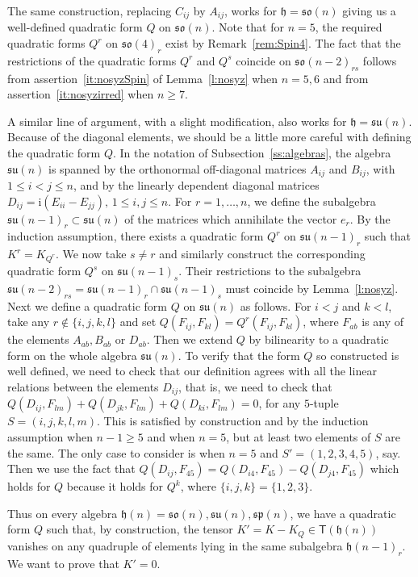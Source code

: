 \documentclass[10pt,a4paper]{amsart}
\newcommand \sT{\mathsf{T}}
\newcommand\h{\mathfrak h}
\newcommand \so{\mathfrak{so}}
\newcommand \spg{\mathfrak{sp}}
\newcommand \su{\mathfrak{su}}
\newcommand \ir{\mathrm{i}}
\newcommand \<{\langle}
\renewcommand \>{\rangle}
\begin{document}
	The same construction, replacing $C_{ij}$ by $A_{ij}$, works for $\h=\so(n)$ giving us a well-defined quadratic form $Q$ on $\so(n)$. Note that for $n=5$, the required quadratic forms $Q^r$ on $\so(4)_r$ exist by Remark~\ref{rem:Spin4}. The fact that the restrictions of the quadratic forms $Q^r$ and $Q^s$ coincide on $\so(n-2)_{rs}$ follows from assertion~\eqref{it:nosyzSpin} of Lemma~\ref{l:nosyz} when $n=5,6$ and from assertion~\eqref{it:nosyzirred} when $n \ge 7$.
	
	A similar line of argument, with a slight modification, also works for $\h = \su(n)$. Because of the diagonal elements, we should be a little more careful with defining the quadratic form $Q$. In the notation of Subsection~\ref{ss:algebras}, the algebra $\su(n)$ is spanned by the orthonormal off-diagonal matrices $A_{ij}$ and $B_{ij}$, with $1 \le i < j\le n$, and by the linearly dependent diagonal matrices $D_{ij} = \ir (E_{ii}- E_{jj}), \, 1 \le i, j\le n$. For $r=1, \dots, n$, we define the subalgebra $\su(n-1)_r \subset \su(n)$ of the matrices which annihilate the vector $e_r$. By the induction assumption, there exists a quadratic form $Q^r$ on $\su(n-1)_r$ such that $K^r = K_{Q^r}$. We now take $s \ne r$ and similarly construct the corresponding quadratic form $Q^s$ on $\su(n-1)_s$. Their restrictions to the subalgebra $\su(n-2)_{rs} = \su(n-1)_r \cap \su(n-1)_s$ must coincide by Lemma~\ref{l:nosyz}. Next we define a quadratic form $Q$ on $\su(n)$ as follows. For $i < j$ and $k < l$, take any $r \notin \{i,j,k,l\}$ and set $Q(F_{ij}, F_{kl}) = Q^r(F_{ij}, F_{kl})$, where $F_{ab}$ is any of the elements $A_{ab}, B_{ab}$ or $D_{ab}$. Then we extend $Q$ by bilinearity to a quadratic form on the whole algebra $\su(n)$. To verify that the form $Q$ so constructed is well defined, we need to check that our definition agrees with all the linear relations between the elements $D_{ij}$, that is, we need to check that $Q(D_{ij}, F_{lm}) + Q(D_{jk}, F_{lm}) + Q(D_{ki}, F_{lm}) = 0$, for any $5$-tuple $S=(i,j,k,l,m)$. This is satisfied by construction and by the induction assumption when $n-1 \ge 5$ and when $n = 5$, but at least two elements of $S$ are the same. The only case to consider is when $n=5$ and $S'=(1,2,3,4,5)$, say. Then we use the fact that $Q(D_{ij}, F_{45}) = Q(D_{i4}, F_{45}) - Q(D_{j4}, F_{45})$ which holds for $Q$ because it holds for $Q^k$, where $\{i,j,k\} = \{1,2,3\}$.
	
	Thus on every algebra $\h(n) = \so(n), \su(n), \spg(n)$, we have a quadratic form $Q$ such that, by construction, the tensor $K' = K - K_Q \in \sT(\h(n))$ vanishes on any quadruple of elements lying in the same subalgebra $\h(n-1)_r$. We want to prove that $K' = 0$.
	
\end{document}
